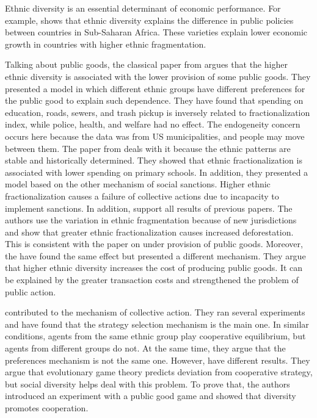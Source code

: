 Ethnic diversity is an essential determinant of economic performance. For example, \cite{Africa} shows that ethnic diversity explains the difference in public policies between countries in Sub-Saharan Africa. These varieties explain lower economic growth in countries with higher ethnic fragmentation. 

Talking about public goods, the classical paper from \cite{AlesinaDivision} argues that the higher ethnic diversity is associated with the lower provision of some public goods. They presented a model in which different ethnic groups have different preferences for the public good to explain such dependence. They have found that spending on education, roads, sewers, and trash pickup is inversely related to fractionalization index, while police, health, and welfare had no effect. The endogeneity concern occurs here because the data was from US municipalities, and people may move between them. The paper from \cite{Kenya} deals with it because the ethnic patterns are stable and historically determined. They showed that ethnic fractionalization is associated with lower spending on primary schools. In addition, they presented a model based on the other mechanism of social sanctions. Higher ethnic fractionalization causes a failure of collective actions due to incapacity to implement sanctions. In addition, \cite{Indonesia} support all results of previous papers. The authors use the variation in ethnic fragmentation because of new jurisdictions and show that greater ethnic fractionalization causes increased deforestation. This is consistent with the paper on under provision of public goods. Moreover, the \cite{transfer} have found the same effect but presented a different mechanism. They argue that higher ethnic diversity increases the cost of producing public goods. It can be explained by the greater transaction costs and strengthened the problem of public action.

\cite{WhyUndermine} contributed to the mechanism of collective action. They ran several experiments and have found that the strategy selection mechanism is the main one. In similar conditions, agents from the same ethnic group play cooperative equilibrium, but agents from different groups do not. At the same time, they argue that the preferences mechanism is not the same one. However, \cite{Cooperation} have different results. They argue that evolutionary game theory predicts deviation from cooperative strategy, but social diversity helps deal with this problem. To prove that, the authors introduced an experiment with a public good game and showed that diversity promotes cooperation.

